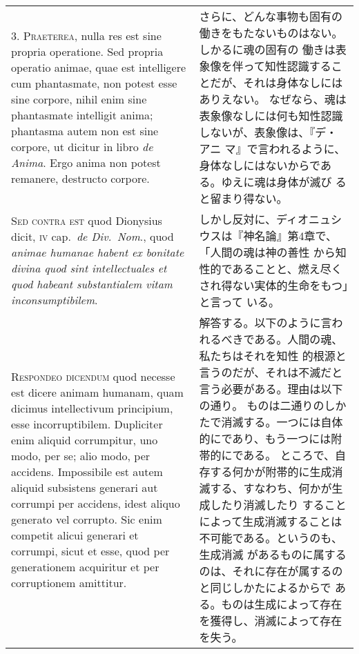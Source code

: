 \documentclass[paper=a4paper,fontsize=10pt,jafontsize=9pt,titlepage]{jlreq}
\begin{document}
\begin{longtable}{p{21em}p{21em}}
\\



3. {\scshape Praeterea}, nulla res est sine propria operatione. Sed propria operatio
animae, quae est intelligere cum phantasmate, non potest esse sine
corpore, nihil enim sine phantasmate intelligit anima; phantasma autem
non est sine corpore, ut dicitur in libro {\itshape de Anima}. Ergo anima non
potest remanere, destructo corpore.


&

さらに、どんな事物も固有の働きをもたないものはない。しかるに魂の固有の
働きは表象像を伴って知性認識することだが、それは身体なしにはありえない。
なぜなら、魂は表象像なしには何も知性認識しないが、表象像は、『デ・アニ
マ』で言われるように、身体なしにはないからである。ゆえに魂は身体が滅び
ると留まり得ない。


\\



{\scshape Sed contra est} quod Dionysius dicit, {\scshape iv} cap.~{\itshape de Div.~Nom}., quod {\itshape animae
humanae habent ex bonitate divina quod sint {\itshape intellectuales} et quod
habeant {\itshape substantialem vitam inconsumptibilem}}.


&

しかし反対に、ディオニュシウスは『神名論』第4章で、「人間の魂は神の善性
 から知性的であることと、燃え尽くされ得ない実体的生命をもつ」と言って
 いる。

\\



{\scshape Respondeo dicendum} quod necesse est dicere animam humanam, quam
dicimus intellectivum principium, esse incorruptibilem. Dupliciter
enim aliquid corrumpitur, uno modo, per se; alio modo, per
accidens. Impossibile est autem aliquid subsistens generari aut
corrumpi per accidens, idest aliquo generato vel corrupto. Sic enim
competit alicui generari et corrumpi, sicut et esse, quod per
generationem acquiritur et per corruptionem amittitur. 


&

解答する。以下のように言われるべきである。人間の魂、私たちはそれを知性
的根源と言うのだが、それは不滅だと言う必要がある。理由は以下の通り。
ものは二通りのしかたで消滅する。一つには自体的にであり、もう一つには附
 帯的にである。
ところで、自存する何かが附帯的に生成消滅する、すなわち、何かが生成したり消滅したり
 することによって生成消滅することは不可能である。というのも、生成消滅
 があるものに属するのは、それに存在が属するのと同じしかたによるからで
 ある。ものは生成によって存在を獲得し、消滅によって存在を失う。



\end{longtable}
\end{document}
